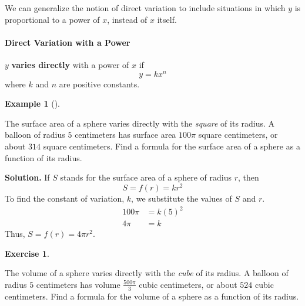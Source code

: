 \documentclass[10pt,]{book}
\newcommand{\terminology}[1]{\textbf{#1}}
\theoremstyle{plain}
\theoremstyle{definition}
\theoremstyle{definition}
\theoremstyle{definition}
\newtheorem{example}[theorem]{Example}
\theoremstyle{definition}
\theoremstyle{definition}
\newtheorem{exercise}[theorem]{Exercise}
\numberwithin{equation}{section}
\newcommand{\amp}{ & }
\begin{document}
	We can generalize the notion of direct variation to include situations in which \(y\) is proportional to a power of \(x\), instead of \(x\) itself.
%
\typeout{************************************************}
\typeout{************************************************}
\paragraph[Direct Variation with a Power]{Direct Variation with a Power}\label{paragraphs-38}
\index{}%
\par

	\(y\) \terminology{varies directly} with a power of \(x\) if
	\begin{equation*}y = kx^n\end{equation*}
	where \(k\) and \(n\) are positive constants.
%
\begin{example}[]\label{example-sphere-surface-area}

	The surface area of a sphere varies directly with the \emph{square} of its radius. A balloon of radius \(5\) centimeters has surface area \(100\pi\) square centimeters, or about \(314\) square centimeters. Find a formula for the surface area of a sphere as a function of its radius.
%
\par\medskip\noindent%
\textbf{Solution.}\quad 
	If \(S\) stands for the surface area of a sphere of radius \(r\), then
	\begin{equation*}S = f (r ) = kr^2\end{equation*}
	To find the constant of variation, \(k\), we substitute the values of \(S\) and \(r\).
	\begin{align*}
	100\pi \amp = k(5)^2\\
	4\pi \amp= k
	\end{align*}
	Thus, \(S = f (r ) = 4πr^2\).
\end{example}
\begin{exercise}\label{exercise-sphere-volume}

	The volume of a sphere varies directly with the \emph{cube} of its radius. A balloon of radius \(5\) centimeters has volume \(\frac{500\pi}{3}\) cubic centimeters, or about \(524\) cubic centimeters. Find a formula for the volume of a sphere as a function of its radius.
\end{exercise}
\par
\end{document}
